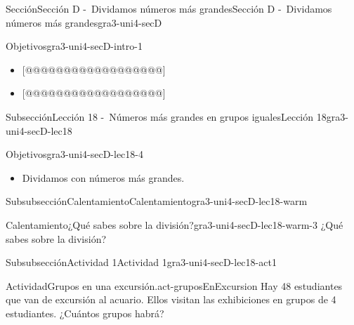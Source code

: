 \documentclass[twoside,14pt,]{extarticle}
\begin{document}
\begin{sectionptx}{Sección}{Sección D -~Dividamos números más grandes}{}{Sección D -~Dividamos números más grandes}{}{}{gra3-uni4-secD}
\begin{introduction}{}%
\begin{objectives}{Objetivos}{gra3-uni4-secD-intro-1}
%
\begin{itemize}[label=\textbullet]
\item{}[@@@@@@@@@@@@@@@@@@]%
\item{}[@@@@@@@@@@@@@@@@@@]%
\end{itemize}
\end{objectives}
\end{introduction}%
%
%
\typeout{************************************************}
\typeout{************************************************}
%
\begin{subsectionptx}{Subsección}{Lección 18 -~Números más grandes en grupos iguales}{}{Lección 18}{}{}{gra3-uni4-secD-lec18}
\begin{objectives}{Objetivos}{gra3-uni4-secD-lec18-4}
%
\begin{itemize}[label=\textbullet]
\item{}Dividamos con números más grandes.%
\end{itemize}
\end{objectives}
%
%
\typeout{************************************************}
\typeout{************************************************}
%
\begin{subsubsectionptx}{Subsubsección}{Calentamiento}{}{Calentamiento}{}{}{gra3-uni4-secD-lec18-warm}
\begin{exploration}{Calentamiento}{¿Qué sabes sobre la división?}{gra3-uni4-secD-lec18-warm-3}%
¿Qué sabes sobre la división?%
\end{exploration}%
\end{subsubsectionptx}
%
%
\typeout{************************************************}
\typeout{************************************************}
%
\begin{subsubsectionptx}{Subsubsección}{Actividad 1}{}{Actividad 1}{}{}{gra3-uni4-secD-lec18-act1}
\begin{activity}{Actividad}{Grupos en una excursión.}{act-gruposEnExcursion}%
Hay 48 estudiantes que van de excursión al acuario. Ellos visitan las exhibiciones en grupos de 4 estudiantes. ¿Cuántos grupos habrá?%
\par

\end{activity}
\end{subsubsectionptx}
\end{subsectionptx}
\end{sectionptx}
\end{document}
